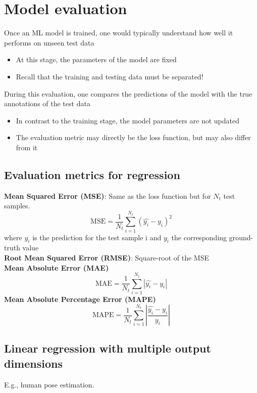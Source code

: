 \section{Model evaluation}
Once an ML model is trained, one would typically understand how well it performs on unseen test data
\begin{itemize}
  \item At this stage, the parameters of the model are fixed
  \item Recall that the training and testing data must be separated!
\end{itemize}
During this evaluation, one compares the predictions of the model with the true annotations of the test data
\begin{itemize}
  \item In contrast to the training stage, the model parameters are not updated
  \item The evaluation metric may directly be the loss function, but may also differ from it
\end{itemize}

\subsection{Evaluation metrics for regression}
\textbf{Mean Squared Error (MSE)}: Same as the loss function but for $N_t$ test samples. 
\[
  \text{MSE} = \frac{1}{N_t}\sum_{i=1}^{N_t}(\hat{y_i} - y_i)^2 
\]
where $\hat{y_i}$ is the prediction for the test sample i and $y_i$ the corresponding ground-truth value\\

\textbf{Root Mean Squared Error (RMSE)}: Square-root of the MSE\\
\textbf{Mean Absolute Error (MAE)}
\[
  \text{MAE} = \frac{1}{N_t}\sum_{i=1}^{N_t}\left|\hat{y_i} - y_i\right|
\]
\textbf{Mean Absolute Percentage Error (MAPE)}
\[
  \text{MAPE} = \frac{1}{N_t}\sum_{i=1}^{N_t}\left|\frac{\hat{y_i} - y_i}{y_i}\right| 
\]

\subsection{Linear regression with multiple output dimensions}
 E.g., human pose estimation.
